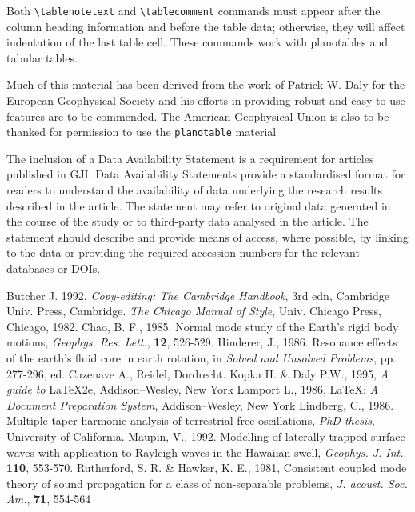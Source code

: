 \documentclass[extra,mreferee]{gji}
\begin{document}
Both \verb"\tablenotetext" and \verb"\tablecomment" 
commands must appear after the column heading information
and before the table data; otherwise, they will affect
indentation of the last table cell.  These commands 
work with planotables and tabular tables.


\begin{acknowledgments}
Much of this material has been derived from the work of Patrick W. Daly
for the European Geophysical Society and his efforts in providing
robust and easy to use features are to be commended.  The American
Geophysical Union is also to be thanked for permission to use the
\verb"planotable"  material
\end{acknowledgments}

\begin{dataavailability}
The inclusion of a Data Availability Statement is a requirement for articles published in GJI. Data Availability Statements provide a standardised format for readers to understand the availability of data underlying the research results described in the article. The statement may refer to original data generated in the course of the study or to third-party data analysed in the article. The statement should describe and provide means of access, where possible, by linking to the data or providing the required accession numbers for the relevant databases or DOIs.
\end{dataavailability}


\begin{thebibliography}{}  
    Butcher J. 1992. {\it Copy-editing: The Cambridge  
    Handbook}, 3rd edn, Cambridge Univ. Press, Cambridge.
    {\it The Chicago Manual of Style}, Univ.   
    Chicago Press, Chicago, 1982.
    Chao, B. F., 1985. Normal mode study of the Earth's rigid 
     body motions, {\it Geophys. Res. Lett.}, {\bf 12}, 526-529.
    Hinderer, J., 1986. Resonance effects of the earth's fluid
    core in earth rotation, in {\it Solved and Unsolved 
    Problems}, pp. 277-296, ed. Cazenave A., Reidel, 
    Dordrecht.
    Kopka H. \& Daly P.W., 1995, \textit{A guide to} \LaTeX2e,
    Addison--Wesley, New York  
    Lamport L., 1986,  \LaTeX: {\it A Document   
    Preparation System}, Addison--Wesley, New York  
    Lindberg, C., 1986.  Multiple taper harmonic analysis of 
    terrestrial free oscillations, {\it PhD thesis}, 
    University of California.
    Maupin, V., 1992. Modelling of laterally trapped surface 
    waves with application to Rayleigh waves in the Hawaiian 
    swell, {\it Geophys. J. Int.}. {\bf 110}, 553-570.     	
      Rutherford, S. R. \& Hawker, K. E., 1981, 
    Consistent coupled mode theory of sound propagation for a 
    class of non-separable problems, 
   {\it J. acoust. Soc. Am.}, {\bf 71}, 554-564
\end{thebibliography}  
  
\end{document}
